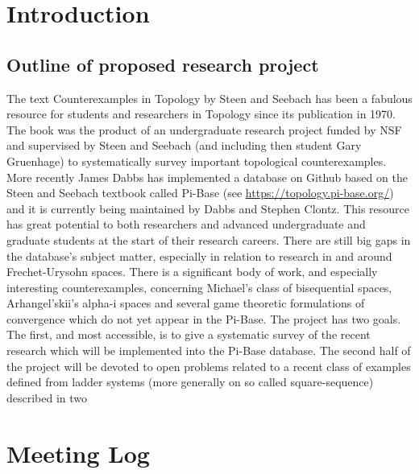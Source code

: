 \documentclass{article}
\begin{document}
\section{Introduction}
\subsection{Outline of proposed research project}

The text Counterexamples in Topology by Steen and Seebach has been a fabulous resource for students and
researchers in Topology since its publication in 1970. The book was the product of an undergraduate research
project funded by NSF and supervised by Steen and Seebach (and including then student Gary Gruenhage) to
systematically survey important topological counterexamples. More recently James Dabbs has implemented a
database on Github based on the Steen and Seebach textbook called Pi-Base (see \href{https://topology.pi-base.org/}{https://topology.pi-base.org/})
and it is currently being maintained by Dabbs and Stephen Clontz. This resource has great potential to both
researchers and advanced undergraduate and graduate students at the start of their research careers. There are
still big gaps in the database's subject matter, especially in relation to research in and around Frechet-Urysohn
spaces. There is a significant body of work, and especially interesting counterexamples, concerning Michael's
class of bisequential spaces, Arhangel'skii's alpha-i spaces and several game theoretic formulations of
convergence which do not yet appear in the Pi-Base. The project has two goals. The first, and most accessible,
is to give a systematic survey of the recent research which will be implemented into the Pi-Base database. The
second half of the project will be devoted to open problems related to a recent class of examples defined from
ladder systems (more generally on so called square-sequence) described in two 

\section{Meeting Log}
\end{document}

